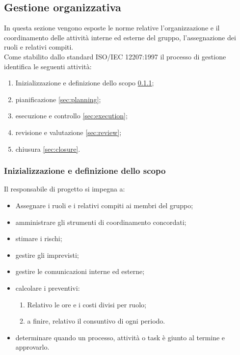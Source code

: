 \subsection{Gestione organizzativa}\label{sec:organizationalP}
    In questa sezione vengono esposte le norme relative l'organizzazione e il coordinamento delle attività interne ed esterne del gruppo, l'assegnazione dei ruoli e relativi compiti. \\
    Come stabilito dallo standard ISO/IEC 12207:1997 \cite{bib:ISO12207_1997} il processo di gestione identifica le seguenti attività:
    \begin{enumerate}
        \item Inizializzazione e definizione dello scopo \ref{sec:scope};
        \item pianificazione \ref{sec:planning};
        \item esecuzione e controllo \ref{sec:execution};
        \item revisione e valutazione \ref{sec:review};
        \item chiusura \ref{sec:closure}.
    \end{enumerate}
    \subsubsection{Inizializzazione e definizione dello scopo}\label{sec:scope}
        Il responsabile di progetto si impegna a:
        \begin{itemize}
            \item Assegnare i ruoli e i relativi compiti ai membri del gruppo;
            \item amministrare gli strumenti di coordinamento concordati;
            \item stimare i rischi;
            \item gestire gli imprevisti;
            \item gestire le comunicazioni interne ed esterne;
            \item calcolare i preventivi:
            \begin{enumerate}
                \item Relativo le ore e i costi divisi per ruolo;
                \item a finire, relativo il consuntivo di ogni periodo.
            \end{enumerate}
            \item determinare quando un processo, attività o task è giunto al termine e approvarlo. 
        \end{itemize}
